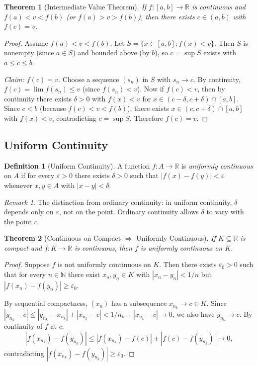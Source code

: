 \documentclass[11pt,a4paper]{article}
\theoremstyle{definition}
\newtheorem{definition}{Definition}[section]
\theoremstyle{plain}
\newtheorem{theorem}{Theorem}[section]
\theoremstyle{remark}
\newtheorem{remark}{Remark}[section]
\newcommand{\R}{\mathbb{R}}
\newcommand{\N}{\mathbb{N}}
\begin{document}
\begin{theorem}[Intermediate Value Theorem]
\label{thm:ivt}
If $f : [a, b] \to \R$ is continuous and $f(a) < v < f(b)$ (or $f(a) > v > f(b)$),
then there exists $c \in (a, b)$ with $f(c) = v$.
\end{theorem}

\begin{proof}
Assume $f(a) < v < f(b)$. Let $S = \{x \in [a, b] : f(x) < v\}$. Then $S$ is
nonempty (since $a \in S$) and bounded above (by $b$), so
$c = \sup S$ exists with $a \le c \le b$.

\emph{Claim: $f(c) = v$.} Choose a sequence $(s_n)$ in $S$ with $s_n \to c$.
By continuity, $f(c) = \lim f(s_n) \le v$ (since $f(s_n) < v$). Now if $f(c) < v$,
then by continuity there exists $\delta > 0$ with $f(x) < v$ for
$x \in (c - \delta, c + \delta) \cap [a, b]$. Since $c < b$ (because $f(c) < v < f(b)$),
there exists $x \in (c, c + \delta) \cap [a, b]$ with $f(x) < v$, contradicting
$c = \sup S$. Therefore $f(c) = v$.
\end{proof}

\subsection{Uniform Continuity}
\label{subsec:uniform_cont}

\begin{definition}[Uniform Continuity]
\label{def:uniform_cont}
A function $f : A \to \R$ is \emph{uniformly continuous} on $A$ if for every
$\varepsilon > 0$ there exists $\delta > 0$ such that $|f(x) - f(y)| < \varepsilon$
whenever $x, y \in A$ with $|x - y| < \delta$.
\end{definition}

\begin{remark}
\label{rem:unif_vs_cont}
The distinction from ordinary continuity: in uniform continuity, $\delta$ depends
only on $\varepsilon$, not on the point. Ordinary continuity allows $\delta$ to vary
with the point $c$.
\end{remark}

\begin{theorem}[Continuous on Compact $\Rightarrow$ Uniformly Continuous]
\label{thm:compact_unif_cont}
If $K \subseteq \R$ is compact and $f : K \to \R$ is continuous, then $f$ is
uniformly continuous on $K$.
\end{theorem}

\begin{proof}
Suppose $f$ is not uniformly continuous on $K$. Then there exists
$\varepsilon_0 > 0$ such that for every $n \in \N$ there exist $x_n, y_n \in K$
with $|x_n - y_n| < 1/n$ but $|f(x_n) - f(y_n)| \ge \varepsilon_0$.

By sequential compactness, $(x_n)$ has a subsequence $x_{n_k} \to c \in K$.
Since $|y_{n_k} - c| \le |y_{n_k} - x_{n_k}| + |x_{n_k} - c| < 1/n_k +
|x_{n_k} - c| \to 0$, we also have $y_{n_k} \to c$. By continuity of $f$ at $c$:
\[
|f(x_{n_k}) - f(y_{n_k})| \le |f(x_{n_k}) - f(c)| + |f(c) - f(y_{n_k})| \to 0,
\]
contradicting $|f(x_{n_k}) - f(y_{n_k})| \ge \varepsilon_0$.
\end{proof}
\end{document}
